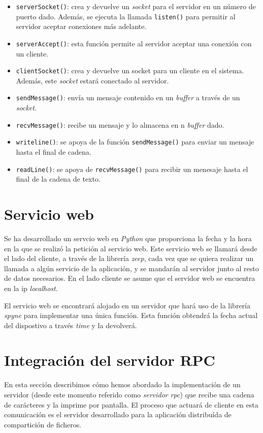 \documentclass[]{article}
\begin{document}
\begin{itemize}
    \item \texttt{serverSocket()}: crea y devuelve un \textit{socket} para el servidor en un número de puerto dado. Además, se ejecuta la llamada \texttt{listen()} para permitir al servidor aceptar conexiones más adelante. 
    \item \texttt{serverAccept()}: esta función permite al servidor aceptar una conexión con un cliente. 
    \item \texttt{clientSocket()}: crea y devuelve un socket para un cliente en el sistema. Además, este \textit{socket} estará conectado al servidor. 
    \item \texttt{sendMessage()}: envía un mensaje contenido en un \textit{buffer} a través de un \textit{socket}. 
    \item \texttt{recvMessage()}: recibe un mensaje y lo almacena en n \textit{buffer} dado. 
    \item \texttt{writeline()}: se apoya de la función \texttt{sendMessage()} para enviar un mensaje hasta el final de cadena.
    \item \texttt{readLine()}: se apoya de \texttt{recvMessage()} para recibir un menesaje hasta el final de la cadena de texto.
\end{itemize}

\section{Servicio web}
\label{sec:web_service}
Se ha desarrollado un servcio web en \textit{Python} que proporciona la fecha y la hora en la que se realizó la petición al servicio web.
Este servicio web se llamará desde el lado del cliente, a través de la librería \textit{zeep}, cada vez que se quiera realizar un llamada a algún servicio de la aplicación, y se mandarán al servidor junto al resto de datos necesarios.
En el lado cliente se asume que el servidor web se encuentra en la ip \textit{localhost}.

El servicio web se encontrará alojado en un servidor que hará uso de la librería \textit{spyne} para implementar una única función. Esta función obtendrá la fecha actual del dispostivo a través \textit{time} y la devolverá.
\section{Integración del servidor RPC}
\label{sec:rpc}
En esta sección describimos cómo hemos abordado la implementación de un servidor (desde este momento referido como \textit{servidor rpc}) que recibe una cadena de carácteres y la imprime por pantalla. El proceso que actuará de cliente en esta comunicación es el servidor desarrollado para la aplicación distribuída de compartición de ficheros. 
\end{document}
